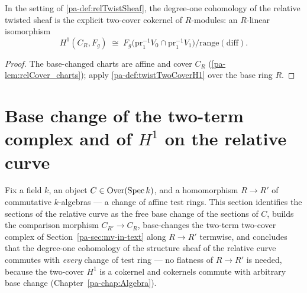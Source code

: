 \begin{definition}
  \label{pa-def:relTwistTwoCoverH1}
  \leanok

  In the setting of \ref{pa-def:relTwistSheaf}, the degree-one cohomology of the relative
  twisted sheaf is the explicit two-cover cokernel of \(R\)-modules: an \(R\)-linear
  isomorphism
  \[
    H^1(C_R, F_g) \;\cong\;
      F_g\bigl(\mathrm{pr}_1^{-1}V_0 \cap \mathrm{pr}_1^{-1}V_1\bigr) \big/
        \mathrm{range}(\mathrm{diff}) .
  \]
\end{definition}
\begin{proof}
  \leanok
  The base-changed charts are affine and cover \(C_R\) (\ref{pa-lem:relCover_charts});
  apply \ref{pa-def:twistTwoCoverH1} over the base ring \(R\).
\end{proof}

\section{Base change of the two-term complex and of \(H^1\) on the relative curve}
\label{pa-sec:relative_h1_base_change}

Fix a field \(k\), an object \(C \in \mathrm{Over}(\operatorname{Spec} k)\), and a homomorphism \(R \to R'\) of
commutative \(k\)-algebras --- a change of affine test rings. This section identifies the
sections of the relative curve as the free base change of the sections of \(C\), builds
the comparison morphism \(C_{R'} \to C_R\), base-changes the two-term two-cover complex
of Section~\ref{pa-sec:mv-in-text} along \(R \to R'\) termwise, and concludes that the
degree-one cohomology of the structure sheaf of the relative curve commutes with
\emph{every} change of test ring --- no flatness of \(R \to R'\) is needed, because the
two-cover \(H^1\) is a cokernel and cokernels commute with arbitrary base change
(Chapter~\ref{pa-chap:Algebra}).

